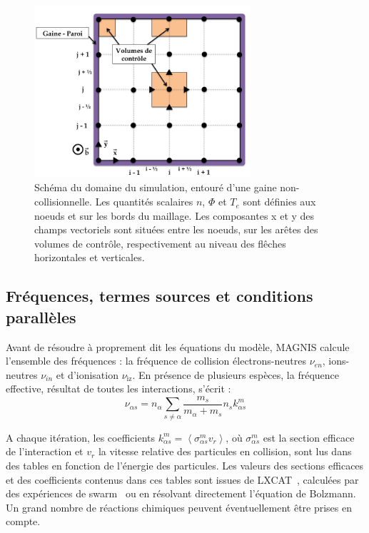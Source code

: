 \begin{refsection}
\begin{figure}[htbp]
\centering
\includegraphics[height=64mm,width=80mm]{figures/3-magnisGrid.png}
{\caption{Schéma du domaine du simulation, entouré d'une gaine
non-collisionnelle.
Les quantités scalaires $n$, $\Phi$ et $T_e$ sont définies aux noeuds et sur les
bords du maillage. Les composantes x et y des champs vectoriels sont
situées entre les noeuds, sur les arêtes des volumes de contrôle, respectivement
au niveau des flêches horizontales et verticales.}
\label{3-maillage}}
\end{figure}

\subsection{Fréquences, termes sources et conditions parallèles}
Avant de résoudre à proprement dit les équations du modèle, MAGNIS
calcule l'ensemble des fréquences : la fréquence de
collision électrons-neutres $\nu_{en}$, ions-neutres $\nu_{in}$ et d'ionisation
$\nu_\text{iz}$. En présence de plusieurs espèces, la fréquence effective, résultat de toutes les
interactions, s'écrit :
\begin{equation*}
\nu_{\alpha s}=n_\alpha\sum_{s\neq\alpha} \frac{m_s}{m_\alpha+m_s}
n_sk^m_{\alpha s}
\end{equation*}

A chaque itération, les coefficients $k^m_{\alpha s}=\left<\sigma^m_{\alpha
s}v_r\right>$, où $\sigma^m_{\alpha
s}$ est la section efficace de l'interaction et $v_r$ la vitesse relative des
particules en collision, sont lus dans des tables en fonction de l'énergie des
particules.
Les valeurs des sections efficaces et des coefficients contenus dans ces tables
sont issues de LXCAT~\parencite{LXCAT}, calculées par des expériences de
swarm~\parencite{Phelps} ou en résolvant directement l'équation de
Bolzmann\parencite{Bolsig}. Un grand
nombre de réactions chimiques peuvent éventuellement être prises en compte.


\end{refsection}
